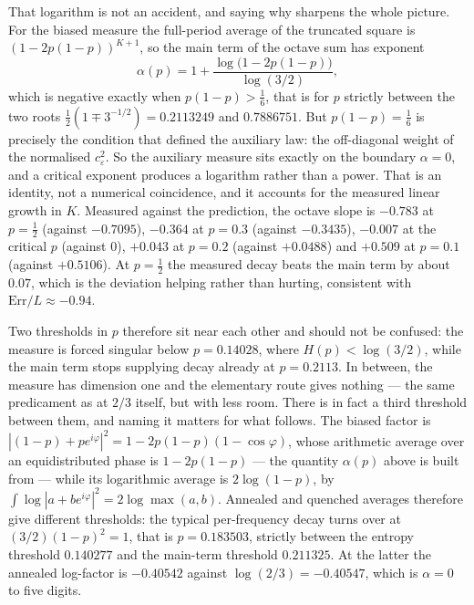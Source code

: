 \documentclass[11pt]{article}
\theoremstyle{remark}
\newcommand{\eps}{\varepsilon}
\begin{document}
That logarithm is not an accident, and saying why sharpens the whole picture. For the biased measure the
full-period average of the truncated square is $(1-2p(1-p))^{K+1}$, so the main term of the octave sum
has exponent
\[
  \alpha(p)=1+\frac{\log\bigl(1-2p(1-p)\bigr)}{\log(3/2)},
\]
which is negative exactly when $p(1-p)>\tfrac16$, that is for $p$ strictly between the two roots
$\tfrac12(1\mp3^{-1/2})=0.2113249$ and $0.7886751$. But $p(1-p)=\tfrac16$ is precisely the condition
that defined the auxiliary law: the off-diagonal weight of the normalised $c_\eps^2$. So the auxiliary
measure sits exactly on the boundary $\alpha=0$, and a critical exponent produces a logarithm rather
than a power. That is an identity, not a numerical coincidence, and it accounts for the measured linear
growth in $K$. Measured against the prediction, the octave slope is $-0.783$ at $p=\tfrac12$ (against
$-0.7095$), $-0.364$ at $p=0.3$ (against $-0.3435$), $-0.007$ at the critical $p$ (against $0$),
$+0.043$ at $p=0.2$ (against $+0.0488$) and $+0.509$ at $p=0.1$ (against $+0.5106$). At $p=\tfrac12$ the
measured decay beats the main term by about $0.07$, which is the deviation helping rather than hurting,
consistent with $\mathrm{Err}/L\approx-0.94$.

Two thresholds in $p$ therefore sit near each other and should not be confused: the measure is forced
singular below $p=0.14028$, where $H(p)<\log(3/2)$, while the main term stops supplying decay already at
$p=0.2113$. In between, the measure has dimension one and the elementary route gives nothing --- the
same predicament as at $2/3$ itself, but with less room. There is in fact a third threshold between them, and naming it matters for what
follows. The biased factor is $|(1-p)+pe^{i\varphi}|^2=1-2p(1-p)(1-\cos\varphi)$, whose arithmetic average
over an equidistributed phase is $1-2p(1-p)$ --- the quantity $\alpha(p)$ above is built from --- while its
logarithmic average is $2\log(1-p)$, by $\int\log|a+be^{i\varphi}|^2=2\log\max(a,b)$. Annealed and quenched
averages therefore give different thresholds: the typical per-frequency decay turns over at
$(3/2)(1-p)^2=1$, that is $p=0.183503$, strictly between the entropy threshold $0.140277$ and the
main-term threshold $0.211325$. At the latter the annealed log-factor is $-0.40542$ against
$\log(2/3)=-0.40547$, which is $\alpha=0$ to five digits.
\end{document}
